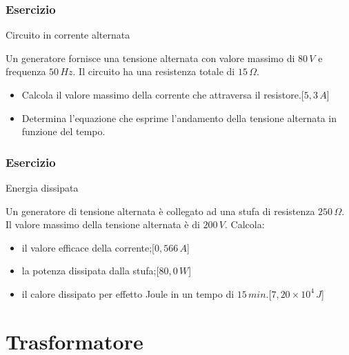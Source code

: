 \documentclass[]{beamer}
\theoremstyle{plain}
\begin{document}
\begin{frame}
\frametitle{Esercizio}
\begin{exampleblock}{Circuito in corrente alternata}
  \small{
    Un generatore fornisce una tensione alternata con valore massimo di $ 80 \, V $ e frequenza $ 50 \, Hz $. Il circuito ha una resistenza totale di $ 15 \, \Omega $.

    \begin{itemize}
      \item Calcola il valore massimo della corrente che attraversa il resistore.\hspace*{\fill}[$ 5,3 \, A $]
      \item Determina l'equazione che esprime l'andamento della tensione alternata in funzione del tempo.
    \end{itemize}}
\end{exampleblock}
\end{frame}



\begin{frame}
\frametitle{Esercizio}
\begin{exampleblock}{Energia dissipata}
  \small{
    Un generatore di tensione alternata è collegato ad una stufa di resistenza $ 250 \, \Omega $. Il valore massimo della tensione alternata è di $ 200 \, V $. Calcola:

    \begin{itemize}
      \item il valore efficace della corrente;\hspace*{\fill}[$ 0,566 \, A $]
      \item la potenza dissipata dalla stufa;\hspace*{\fill}[$ 80,0 \, W $]
      \item il calore dissipato per effetto Joule in un tempo di $ 15 \, min $.\hspace*{\fill}[$ 7,20 \times 10^{4} \, J $]
    \end{itemize}}
\end{exampleblock}
\end{frame}




\section{Trasformatore}
\end{document}
